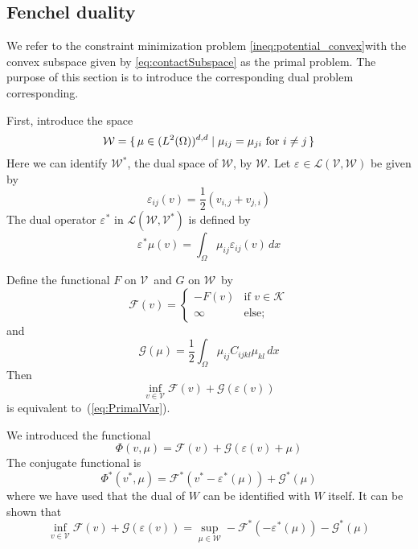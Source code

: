 \documentclass[12pt,a4paper]{article}
\numberwithin{equation}{section}
\numberwithin{table}{section}
\numberwithin{figure}{section}
\newcommand{\W}{\ensuremath{\mathcal{W}}}
\newcommand{\half}{\ensuremath{\frac{1}{2}}}
\newcommand{\V}{\ensuremath{\mathcal{V}}}
\newcommand{\K}{\ensuremath{\mathcal{K}}}
\renewcommand{\L}{{\mathcal L}}
\newcommand{\F}{\ensuremath{{\mathcal F}}}
\newcommand{\G}{\ensuremath{{\mathcal G}}}
\newcommand{\intO}{\int_\Omega\!\!}
\renewcommand{\epsilon}{\varepsilon}
\newcommand{\strain}[1][]{\ensuremath{\epsilon_{#1}}}
\newcommand{\epsij}{\strain[ij]}
\providecommand{\dualp}[2]{\langle #1, #2 \rangle}
\newcommand{\infvinV}{\ensuremath{\inf_{v\in \V}}}
\newcommand{\dx}{{\,dx}}
\begin{document}
\subsection{Fenchel duality}

We refer to the constraint minimization problem \eqref{ineq:potential_convex}with the convex subspace given by \eqref{eq:contactSubspace} as the primal problem. The purpose of this section is to introduce the corresponding dual problem corresponding.

First, introduce the space
\begin{equation}
  \W = \set{\mu \in (L^2(\Omega))^{d,d} | \mu_{ij} = \mu_{ji}
    \text{ for } i\ne j } 
\end{equation}
Here we can identify $\W^*$, the dual space of $\W$, by $\W$.  Let $\strain \in \L(\V,\W)$
be given by
\begin{equation}
  \epsij(v) = \half (v_{i,j} + v_{j,i})
\end{equation}
The dual operator
$\strain^*$ in $\L(\W,\V^*)$ is defined by
\begin{equation}
  \strain^* \mu(v) = \intO \mu_{ij} \epsij(v) \dx
\end{equation}

Define the functional $F$ on \V\ and $G$ on \W\ by
\begin{equation}
  \F(v) =
  \begin{cases}
    -F(v) & \text{if } v \in \K \\
    \infty & \text{else;}
  \end{cases}
\end{equation}
and
\begin{equation}
  \G(\mu) = \half \intO \mu_{ij} C_{ijkl} \mu_{kl} \dx
\end{equation}
Then
\begin{equation}
  \label{ineq:primalFenchel}
  \infvinV \F(v) + \G(\strain(v))
\end{equation}
is equivalent to~(\ref{eq:PrimalVar}).

We introduced the functional
\begin{equation}
\varPhi(v,\mu) = \F(v) + \G(\epsilon(v) + \mu)
\end{equation}
The conjugate functional is
\begin{equation}
  \varPhi^*(v^*, \mu) = \F^*(v^* - \strain^*(\mu)) + \G^*(\mu)
\end{equation}
where we have used that the dual of $W$ can be identified with $W$ itself. It can be shown that
\begin{equation}
  \inf_{v\in \V} \F(v) + \G(\strain(v))
  = \sup_{\mu\in \W} -\F^*(-\strain^*(\mu)) - \G^*(\mu)
\end{equation}
\end{document}
